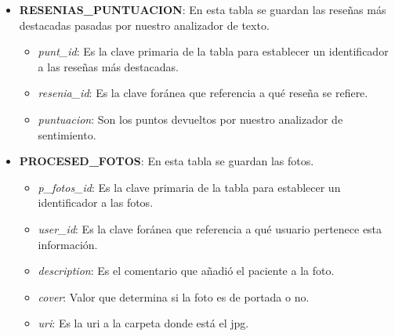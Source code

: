 \begin{itemize}
	\item \textbf{RESENIAS\_PUNTUACION}: En esta tabla se guardan las reseñas más destacadas pasadas por nuestro analizador de texto.
	\begin{itemize}
		\item \textit{ punt\_id}: Es la clave primaria de la tabla para establecer un identificador a las reseñas más destacadas.
		\item \textit{ resenia\_id}: Es la clave foránea que referencia a qué reseña se refiere.
		\item \textit{ puntuacion}: Son los puntos devueltos por nuestro analizador de sentimiento.
	\end{itemize}
	\item \textbf{PROCESED\_FOTOS}: En esta tabla se guardan las fotos.
	\begin{itemize}
		\item \textit{p\_fotos\_id}: Es la clave primaria de la tabla para establecer un identificador a las fotos.
		\item \textit{ user\_id}: Es la clave foránea que referencia a qué usuario pertenece esta información.
		\item \textit{ description}: Es el comentario que añadió el paciente a la foto.
		\item \textit{cover}: Valor que determina si la foto es de portada o no.
		\item \textit{uri}: Es la uri a la carpeta donde está el jpg.
	\end{itemize}
\end{itemize}